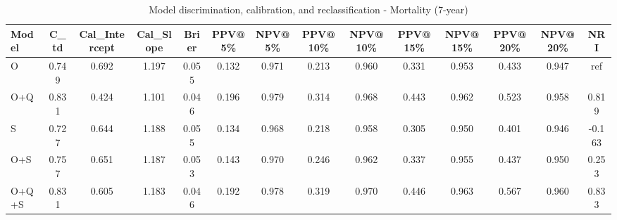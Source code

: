\begin{table}[htbp]
\centering
\small
\caption{Model discrimination, calibration, and reclassification - Mortality (7-year)}
\label{tab:perf_mortality_7y}
\begin{tabular}{lccccccccccccc}
\toprule
Model & C\_td & Cal\_Intercept & Cal\_Slope & Brier & PPV@5\% & NPV@5\% & PPV@10\% & NPV@10\% & PPV@15\% & NPV@15\% & PPV@20\% & NPV@20\% & NRI \\
\midrule
O & 0.749 & 0.692 & 1.197 & 0.055 & 0.132 & 0.971 & 0.213 & 0.960 & 0.331 & 0.953 & 0.433 & 0.947 & ref \\
O+Q & 0.831 & 0.424 & 1.101 & 0.046 & 0.196 & 0.979 & 0.314 & 0.968 & 0.443 & 0.962 & 0.523 & 0.958 & 0.819 \\
S & 0.727 & 0.644 & 1.188 & 0.055 & 0.134 & 0.968 & 0.218 & 0.958 & 0.305 & 0.950 & 0.401 & 0.946 & -0.163 \\
O+S & 0.757 & 0.651 & 1.187 & 0.053 & 0.143 & 0.970 & 0.246 & 0.962 & 0.337 & 0.955 & 0.437 & 0.950 & 0.253 \\
O+Q+S & 0.831 & 0.605 & 1.183 & 0.046 & 0.192 & 0.978 & 0.319 & 0.970 & 0.446 & 0.963 & 0.567 & 0.960 & 0.833 \\
\bottomrule
\end{tabular}
\end{table}
